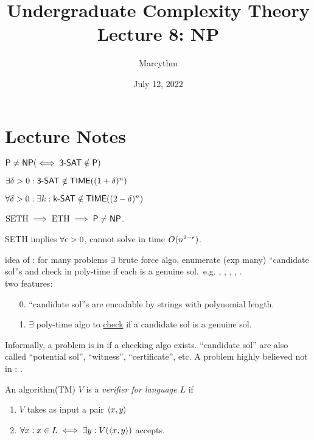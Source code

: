 \documentclass{article}
\title{Undergraduate Complexity Theory \\ Lecture 8: NP}
\author{Marcythm}
\date{July 12, 2022}
\begin{document}
\maketitle{}

\section{Lecture Notes}

\begin{conjecture}
  \( \text{\sf P} \neq \text{\sf NP} ( \iff \text{\sf 3-SAT} \notin \text{\sf P} ) \)
\end{conjecture}

\begin{conjecture}
  \( \exists \delta>0: \text{\sf 3-SAT} \notin \text{\sf TIME}((1+\delta)^n)\)
\end{conjecture}

\begin{conjecture}
  \( \forall \delta>0: \exists k: \text{\sf k-SAT} \notin \text{\sf TIME}((2-\delta)^n) \)
\end{conjecture}

\( \mathrm{SETH} \implies \mathrm{ETH} \implies \text{\sf P} \neq \text{\sf NP} \).

\begin{theorem}[ABV '15]
  SETH implies \( \forall \epsilon>0 \), cannot solve  in time \(O(n^{2-\epsilon})\).
\end{theorem}

idea of \NP: for many problems \(\exists\) brute force algo, enumerate (exp many) ``candidate sol''s and check in poly-time if each is a genuine sol.\ e.g. , , , , . \\

two features:
\begin{enumerate}
  \item[0.] ``candidate sol''s  are encodable by strings with polynomial length.
  \item[1.] \(\exists\) poly-time algo to \ul{check} if a candidate sol is a genuine sol.
\end{enumerate}

Informally, a problem is in \NP if a checking algo exists. ``candidate sol'' are also called ``potential sol'', ``witness'', ``certificate'', etc. A problem highly believed not in \NP: .

\begin{definition}
  An algorithm(TM) \(V\) is a {\it verifier for language \(L\)} if
  \begin{enumerate}
    \item \(V\) takes as input a pair \(\left\langle x, y \right\rangle\)
    \item \(\forall x: x \in L \iff \exists y: V(\left\langle x, y \right\rangle)\) accepts.
  \end{enumerate}
\end{definition}
\end{document}
